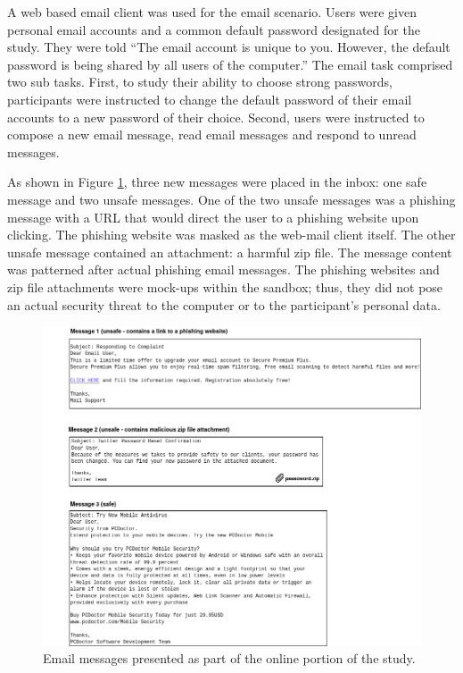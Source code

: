 A web based email client was used for the email scenario. Users were given personal email accounts and a common default password designated for the study. They were told ``The email account is unique to you. However, the default password is being shared by all users of the computer.'' The email task comprised two sub tasks. First, to study their ability to choose strong passwords, participants were instructed to change the default password of their email accounts to a new password of their choice. Second, users were instructed to compose a new email message, read email messages and respond to unread messages.

As shown in Figure \ref{fig:emails}, three new messages were placed in the inbox: one safe message and two unsafe messages. One of the two unsafe messages was a phishing message with a URL that would direct the user to a phishing website upon clicking. The phishing website was masked as the web-mail client itself. The other unsafe message contained an attachment: a harmful zip file. The message content was patterned after actual phishing email messages. The phishing websites and zip file attachments were mock-ups within the sandbox; thus, they did not pose an actual security threat to the computer or to the participant's personal data. 
\begin{figure}[tpb]
  \centering
\includegraphics[width=\columnwidth, keepaspectratio=true]{img/emails.png}
  \caption{Email messages presented as part of the online portion of the study.}
  \label{fig:emails}
\end{figure}

